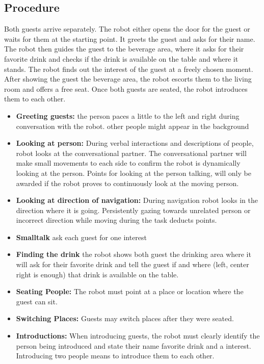 \subsection*{Procedure}
Both guests arrive separately. The robot either opens the door for the guest or waits for them at the starting point. It greets the guest and asks for their name. The robot then guides the guest to the beverage area, where it asks for their favorite drink and checks if the drink is available on the table and where it stands. The robot finds out the interest of the guest at a freely chosen moment. After showing the guest the beverage area, the robot escorts them to the living room and offers a free seat. Once both guests are seated, the robot introduces them to each other.
\begin{itemize}
	\item \textbf{Greeting guests:} the person paces a little to the left and right during conversation with the robot. other people might appear in the background
	
	\item \textbf{Looking at person:} During verbal interactions and descriptions of people, robot 
	looks at the conversational partner. The conversational partner will make small movements to each side to confirm the robot is dynamically looking at the person. Points for looking at the person talking, will only be awarded if the robot proves to continuously look at the moving person. 
	
	\item \textbf{Looking at direction of navigation:} During navigation robot looks in the direction where it is going. Persistently gazing towards unrelated person or incorrect direction while moving during the task deducts points. 
    
    \item \textbf{Smalltalk} ask each guest for one interest 
    
    \item \textbf{Finding the drink} the robot shows both guest the drinking area where it will ask for their favorite drink and tell the guest if and where (left, center right is enough) that drink is available on the table. 
	
	\item \textbf{Seating People:} The robot must point at a place or location where the guest can sit.
	
	\item \textbf{Switching Places:} Guests may switch places after they were seated.
	
	\item \textbf{Introductions:} When introducing guests, the robot must clearly identify the person being introduced and state their name favorite drink and a interest. Introducing two people means to introduce them to each other. 
\end{itemize}

